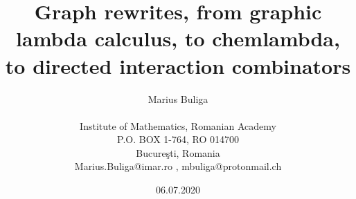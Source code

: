 \documentclass{article}
\begin{document}
\vspace{.5cm}

\pagestyle{plain}
\vspace{.5cm}









\newtheorem{theorem}{Theorem}[section]

\newtheorem{proposition}[theorem]{Proposition}
\vspace{.5cm}
\newtheorem{lemma}[theorem]{Lemma}
\vspace{.5cm}
\newtheorem{corollary}[theorem]{Corollary}
\vspace{.5cm}
\newtheorem{definition}[theorem]{Definition}
\vspace{.5cm}
\newtheorem{remark}[theorem]{Remark}
\vspace{.5cm}
\newtheorem{exempl}{Example}[section]

\newenvironment{example}{\begin{exempl}  \em}{\hfill $\square$

\end{exempl}}  \vspace{.5cm}
\vspace{.5cm}








\renewcommand{\contentsname}{ }
\vspace{.5cm}



\title{Graph rewrites, from graphic lambda calculus, to chemlambda, to directed interaction combinators}
\vspace{.5cm}
\author{Marius Buliga \\ 
\\
Institute of Mathematics, Romanian Academy \\
P.O. BOX 1-764, RO 014700\\
Bucure\c sti, Romania\\ 
{\footnotesize Marius.Buliga@imar.ro , mbuliga@protonmail.ch}}  \vspace{.5cm}
\vspace{.5cm}






\date{06.07.2020}
\vspace{.5cm}
\end{document}
